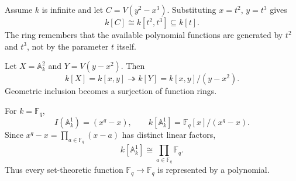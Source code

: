 \begin{example}
Assume \(k\) is infinite and let \(C=V(y^2-x^3)\).  Substituting \(x=t^2\), \(y=t^3\)
gives
\[
k[C]\cong k[t^2,t^3]\subseteq k[t].
\]
The ring remembers that the available polynomial functions are generated by \(t^2\) and
\(t^3\), not by the parameter \(t\) itself.
\end{example}

\begin{example}
Let \(X=\mathbb A_k^2\) and \(Y=V(y-x^2)\).  Then
\[
k[X]=k[x,y]\twoheadrightarrow k[Y]=k[x,y]/(y-x^2).
\]
Geometric inclusion becomes a surjection of function rings.
\end{example}

\begin{example}
For \(k=\mathbb F_q\),
\[
I(\mathbb A^1_k)=(x^q-x),
\qquad
k[\mathbb A^1_k]=\mathbb F_q[x]/(x^q-x).
\]
Since \(x^q-x=\prod_{a\in\mathbb F_q}(x-a)\) has distinct linear factors,
\[
k[\mathbb A^1_k]\cong\prod_{a\in\mathbb F_q}\mathbb F_q.
\]
Thus every set-theoretic function \(\mathbb F_q\to\mathbb F_q\) is represented by a
polynomial.
\end{example}
